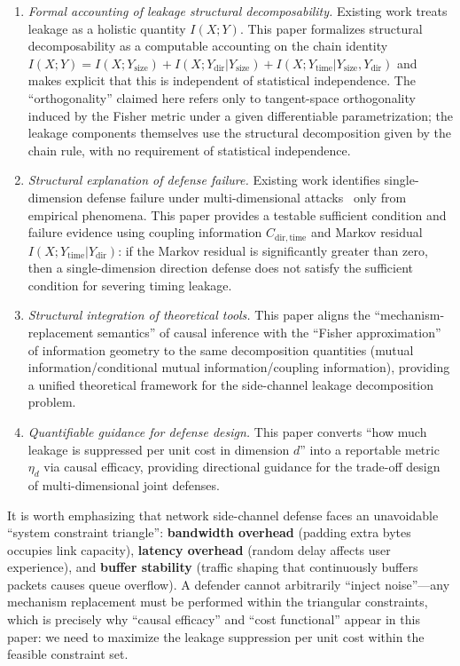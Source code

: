 \documentclass[lettersize,journal]{IEEEtran}
\begin{document}
\begin{enumerate}[label=(\arabic*)]
\item \emph{Formal accounting of leakage structural decomposability.}
  Existing work treats leakage as a holistic quantity $I(X;Y)$.
  This paper formalizes structural decomposability as a computable
  accounting on the chain identity
  $I(X;Y)=I(X;Y_{\mathrm{size}})+I(X;Y_{\mathrm{dir}}|Y_{\mathrm{size}})+
  I(X;Y_{\mathrm{time}}|Y_{\mathrm{size}},Y_{\mathrm{dir}})$
  and makes explicit that this is independent of statistical independence.
  The ``orthogonality'' claimed here refers only to tangent-space
  orthogonality induced by the Fisher metric under a given differentiable
  parametrization; the leakage components themselves use the structural
  decomposition given by the chain rule, with no requirement of statistical
  independence.

\item \emph{Structural explanation of defense failure.}
  Existing work identifies single-dimension defense failure under
  multi-dimensional attacks~\cite{mathews2023sok,shen2023subverting}
  only from empirical phenomena.
  This paper provides a testable sufficient condition and failure
  evidence using coupling information $C_{\mathrm{dir,time}}$ and Markov
  residual $I(X;Y_{\mathrm{time}}|Y_{\mathrm{dir}})$:
  if the Markov residual is significantly greater than zero, then a
  single-dimension direction defense does not satisfy the sufficient
  condition for severing timing leakage.

\item \emph{Structural integration of theoretical tools.}
  This paper aligns the ``mechanism-replacement semantics'' of causal
  inference with the ``Fisher approximation'' of information geometry to
  the same decomposition quantities (mutual information/conditional mutual
  information/coupling information), providing a unified theoretical
  framework for the side-channel leakage decomposition problem.

\item \emph{Quantifiable guidance for defense design.}
  This paper converts ``how much leakage is suppressed per unit cost in
  dimension $d$'' into a reportable metric $\eta_d$ via causal efficacy,
  providing directional guidance for the trade-off design of
  multi-dimensional joint defenses.
\end{enumerate}

It is worth emphasizing that network side-channel defense faces an
unavoidable ``system constraint triangle'': \textbf{bandwidth overhead}
(padding extra bytes occupies link capacity), \textbf{latency overhead}
(random delay affects user experience), and \textbf{buffer stability}
(traffic shaping that continuously buffers packets causes queue overflow).
A defender cannot arbitrarily ``inject noise''---any mechanism replacement
must be performed within the triangular constraints, which is precisely why
``causal efficacy'' and ``cost functional'' appear in this paper: we need
to maximize the leakage suppression per unit cost within the feasible
constraint set.
\end{document}
